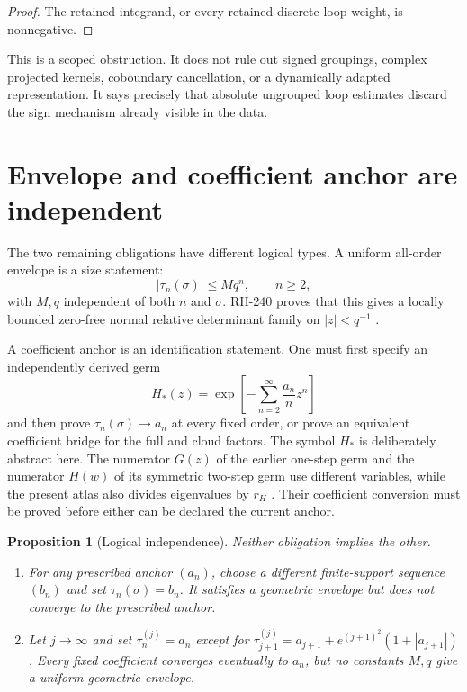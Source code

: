 \documentclass[11pt]{article}
\newtheorem{proposition}[theorem]{Proposition}
\theoremstyle{remark}
\begin{document}
\begin{proof}
The retained integrand, or every retained discrete loop weight, is
nonnegative.
\end{proof}

This is a scoped obstruction.  It does not rule out signed groupings,
complex projected kernels, coboundary cancellation, or a dynamically adapted
representation.  It says precisely that absolute ungrouped loop estimates
discard the sign mechanism already visible in the data.

\section{Envelope and coefficient anchor are independent}

The two remaining obligations have different logical types.  A uniform
all-order envelope is a size statement:
\begin{equation}\label{eq:envelope}
 |\tau_n(\sigma)|\le Mq^n,
 \qquad n\ge2,
\end{equation}
with $M,q$ independent of both $n$ and $\sigma$.  RH-240 proves that this
gives a locally bounded zero-free normal relative determinant family on
$|z|<q^{-1}$ \citep{WangRH240}.

A coefficient anchor is an identification statement.  One must first specify
an independently derived germ
\[
 H_*(z)=\exp\left[-\sum_{n=2}^{\infty}\frac{a_n}{n}z^n\right]
\]
and then prove $\tau_n(\sigma)\to a_n$ at every fixed order, or prove an
equivalent coefficient bridge for the full and cloud factors.  The symbol
$H_*$ is deliberately abstract here.  The numerator $G(z)$ of the earlier
one-step germ and the numerator $H(w)$ of its symmetric two-step germ use
different variables, while the present atlas also divides eigenvalues by
$r_H$ \citep{WangRH46,WangRH80}.  Their coefficient conversion must be
proved before either can be declared the current anchor.

\begin{proposition}[Logical independence]\label{prop:independence}
Neither obligation implies the other.
\begin{enumerate}[leftmargin=2em]
\item For any prescribed anchor $(a_n)$, choose a different finite-support
sequence $(b_n)$ and set $\tau_n(\sigma)=b_n$.  It satisfies a geometric
envelope but does not converge to the prescribed anchor.
\item Let $j\to\infty$ and set $\tau_n^{(j)}=a_n$ except for
$\tau_{j+1}^{(j)}=a_{j+1}+e^{(j+1)^2}(1+|a_{j+1}|)$.  Every fixed coefficient converges
eventually to $a_n$, but no constants $M,q$ give a uniform geometric
envelope.
\end{enumerate}
\end{proposition}
\end{document}
